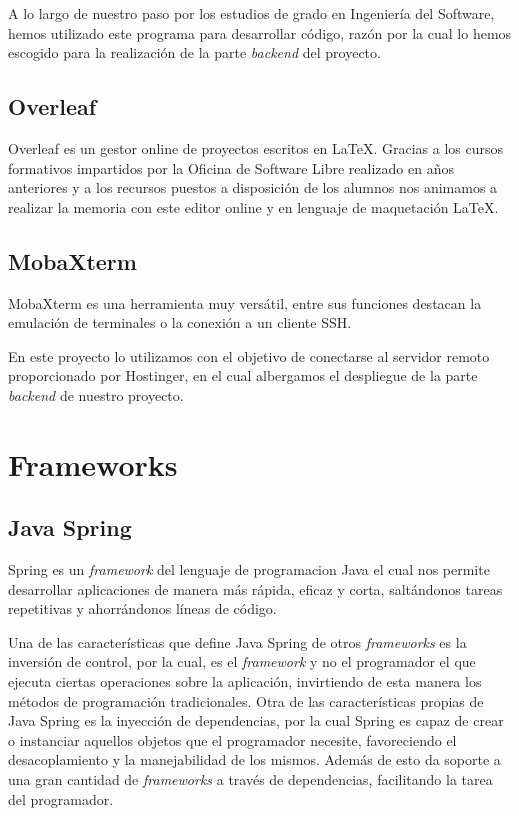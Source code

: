      A lo largo de nuestro paso por los estudios de grado en Ingeniería del Software, hemos utilizado este programa para desarrollar código, razón por la cual lo hemos escogido para la realización de la parte \textit{backend} del proyecto.
     
     
     \subsection{Overleaf}
     Overleaf\cite{overleaf} es un gestor online de proyectos escritos en \LaTeX. Gracias a los cursos formativos impartidos por la Oficina de Software Libre\cite{ucmsoftwarelibre} realizado en años anteriores y a los recursos puestos a disposición de los alumnos\cite{recursoslatex} nos animamos a realizar la memoria con este editor online y en lenguaje de maquetación \LaTeX.
     
     
         \subsection{MobaXterm}
     MobaXterm\cite{mobaxterm} es una herramienta muy versátil, entre sus funciones destacan la emulación de terminales o la conexión a un cliente SSH.
     \newline 
     
     En este proyecto lo utilizamos con el objetivo de conectarse al servidor remoto proporcionado por Hostinger\cite{hostinger}, en el cual albergamos el despliegue de la parte \textit{backend} de nuestro proyecto.\newpage
     
     
     \section{Frameworks}
     
     \subsection{Java Spring}
     Spring\cite{javaspring} es un \textit{framework} del lenguaje de programacion Java el cual nos permite desarrollar aplicaciones de manera más rápida, eficaz y corta, saltándonos tareas repetitivas y ahorrándonos líneas de código.
     \newline
     
     Una de las características que define  Java Spring de otros \textit{frameworks} es la inversión de control, por la cual, es el \textit{framework} y no el programador el que ejecuta ciertas operaciones sobre la aplicación, invirtiendo de esta manera los métodos de programación tradicionales.
     Otra de las características propias de Java Spring es la inyección de dependencias, por la cual Spring es capaz de crear o instanciar aquellos objetos que el programador necesite, favoreciendo el desacoplamiento y la manejabilidad de los mismos.
     Además de esto da soporte a una gran cantidad de \textit{frameworks} a través de dependencias, facilitando la tarea del programador.
     \newline
     
